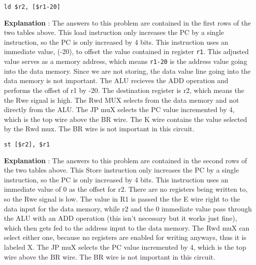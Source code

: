 \documentclass[a4paper,11pt]{article}
\begin{document}
\item \texttt{ld \$r2, [\$r1-20]}

\textbf{Explanation} : The answers to this problem are contained in the first rows of the two tables above. This load instruction only increases the PC by a single instruction, so the PC is only increased by 4 bits. This instruction uses an immediate value, (-20), to offset the value contained in register \texttt{r1}. This adjusted value serves as a memory address, which means \texttt{r1-20} is the address value going into the data memory. Since we are not storing, the data value line going into the data memory is not important. The ALU recieves the ADD operation and performs the offset of r1 by -20. The destination register is r2, which means the the Rwe signal is high. The Rwd MUX selects from the data memory and not directly from the ALU. The JP muX selects the PC value incremented by 4, which is the top wire above the BR wire. The K wire contains the value selected by the Rwd mux. The BR wire is not important in this circuit.

\item \texttt{st [\$r2], \$r1}

\textbf{Explanation} : The answers to this problem are contained in the second rows of the two tables above. This Store instruction only increases the PC by a single instruction, so the PC is only increased by 4 bits. This instruction uses an immediate value of 0 as the offset for r2. There are no registers being written to, so the Rwe signal is low. The value in R1 is passed the the E wire right to the data input for the data memory, while r2 and the 0 immediate value pass through the ALU with an ADD operation (this isn't necessary but it works just fine), which then gets fed to the address input to the data memory. The Rwd muX can select either one, because no registers are enabled for writing anyways, thus it is labeled X. The JP muX selects the PC value incremented by 4, which is the top wire above the BR wire. The BR wire is not important in this circuit.
\end{document}

